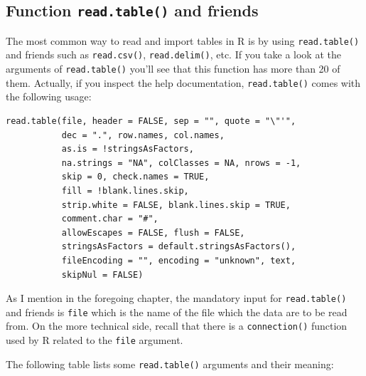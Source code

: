 \documentclass[
]{book}
\begin{document}
\hypertarget{function-read.table-and-friends}{%
\subsection{\texorpdfstring{Function \texttt{read.table()} and friends}{Function read.table() and friends}}\label{function-read.table-and-friends}}

The most common way to read and import tables in R is by using
\texttt{read.table()} and friends such as \texttt{read.csv()}, \texttt{read.delim()}, etc. If you
take a look at the arguments of \texttt{read.table()} you'll see that this function
has more than 20 of them. Actually, if you inspect the help documentation,
\texttt{read.table()} comes with the following usage:

\begin{verbatim}
read.table(file, header = FALSE, sep = "", quote = "\"'",
           dec = ".", row.names, col.names,
           as.is = !stringsAsFactors,
           na.strings = "NA", colClasses = NA, nrows = -1,
           skip = 0, check.names = TRUE,
           fill = !blank.lines.skip,
           strip.white = FALSE, blank.lines.skip = TRUE,
           comment.char = "#",
           allowEscapes = FALSE, flush = FALSE,
           stringsAsFactors = default.stringsAsFactors(),
           fileEncoding = "", encoding = "unknown", text,
           skipNul = FALSE)
\end{verbatim}

As I mention in the foregoing chapter, the mandatory input for \texttt{read.table()}
and friends is \texttt{file} which is the name of the file which the data are to be
read from. On the more technical side, recall that there is a \texttt{connection()}
function used by R related to the \texttt{file} argument.

The following table lists some \texttt{read.table()} arguments and their meaning:
\end{document}
